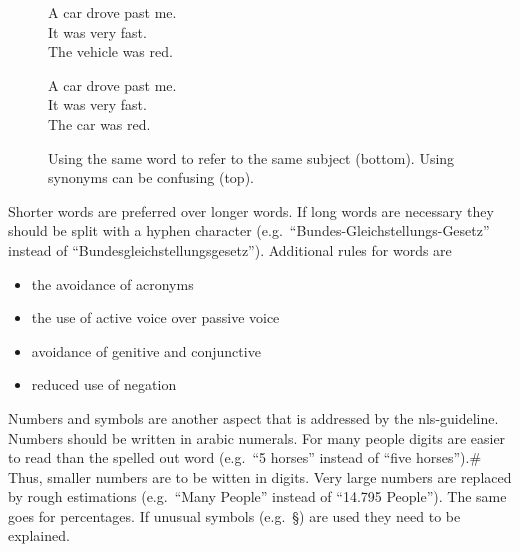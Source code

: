 \begin{figure}[htb]
    \begin{center}
        \colorbox{badred!20}{
            \begin{minipage}{0.6\textwidth}
                A car drove past me.\\
                It was very fast.\\
                The vehicle was red.
            \end{minipage}
        }
        \colorbox{goodgreen!20}{
            \begin{minipage}{0.6\textwidth}
                A car drove past me.\\
                It was very fast.\\
                The car was red.
            \end{minipage}
        }
    \end{center}
    \caption[Using the same word to refer to the same subject.]{Using the same word to refer to the same subject (bottom). Using synonyms can be confusing (top).}
    \label{fig:subject_ref}
\end{figure}
Shorter words are preferred over longer words.
If long words are necessary they should be split with a hyphen character (e.g.\ \enquote{Bundes-Gleichstellungs-Gesetz} instead of \enquote{Bundesgleichstellungsgesetz}).
Additional rules for words are
\begin{itemize}[noitemsep]
    \item the avoidance of acronyms
    \item the use of active voice over passive voice
    \item avoidance of genitive and conjunctive
    \item reduced use of negation
\end{itemize}
Numbers and symbols are another aspect that is addressed by the \gls{nls}-guideline.
Numbers should be written in arabic numerals.
For many people digits are easier to read than the spelled out word (e.g.\ \enquote{5 horses} instead of \enquote{five horses}).#
Thus, smaller numbers are to be witten in digits.
Very large numbers are replaced by rough estimations (e.g.\ \enquote{Many People} instead of \enquote{14.795 People}).
The same goes for percentages.
If unusual symbols (e.g.\ §) are used they need to be explained.

